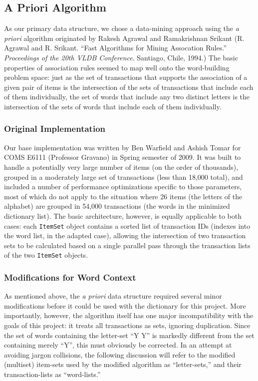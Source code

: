 \documentclass[11pt]{article}
\begin{document}
\subsection{A Priori Algorithm} %

As our primary data structure, we chose a data-mining approach using the {\it a priori} algorithm originated by Rakesh Agrawal and Ramakrishnan Srikant (R. Agrawal and R. Srikant.  ``Fast Algorithms for Mining Assocation Rules.''  {\it Proceedings of the 20th VLDB Conference}.  Santiago, Chile, 1994.)  The basic properties of association rules seemed to map well onto the word-building problem space: just as the set of transactions that supports the association of a given pair of items is the intersection of the sets of transactions that include each of them individually,
 the set of words that include any two distinct letters is the intersection of the sets of words that include each of them individually.

\subsubsection{Original Implementation}

Our base implementation was written by Ben Warfield and Ashish Tomar for COMS E6111 (Professor Gravano) in Spring semester of 2009.  It was built to handle a potentially very large number of items (on the order of thousands), grouped in a moderately large set of transactions (less than 18,000 total), and included a number of performance optimizations specific to those parameters, most of which do not apply to the situation where 26 items (the letters of the alphabet) are grouped in 54,000 transactions (the words in the minimized dictionary list).  The basic architecture, however, is equally applicable to both cases: each {\tt ItemSet} object contains a sorted list of transaction IDs (indexes into the word list, in the adapted case), allowing the intersection of two transaction sets to be calculated based on a single parallel pass through the transaction lists of the two {\tt ItemSet} objects.



\subsubsection{Modifications for Word Context}

As mentioned above, the {\it a priori} data structure required several minor modifications before it could be used with the dictionary for this project.  More importantly, however, the algorithm itself has one major incompatibility with the goals of this project: it treats all transactions as sets, ignoring duplication.  Since the set of words containing the letter-set ``Y Y'' is markedly different from the set containing merely ``Y'', this must obviously be corrected.  In an attempt at avoiding jargon collisions, the following discussion will refer to the modified (multiset) item-sets used by the modified algorithm as ``letter-sets,'' and their transaction-lists as ``word-lists.''  
\end{document}
